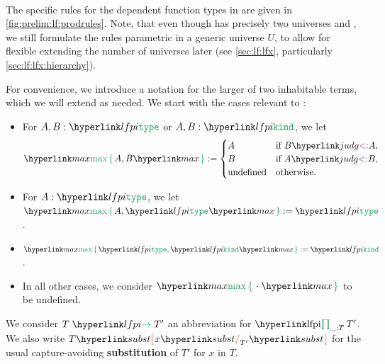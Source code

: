 % 


\paragraph{} The specific rules for the dependent function types in \LF are given in \autoref{fig:prelim:lf:prodrules}. Note, that even though \LF has precisely two universes \type and \kind, we still formulate the rules parametric in a generic universe $U$, to allow for flexible extending the number of universes later (see \autoref{sec:lf:lfx}, particularly \autoref{sec:lf:lfx:hierarchy}). \medskip

\begin{definition}\label{def:lf:max}
\hypertarget{max}{For convenience, we introduce a notation for the larger of two inhabitable terms}, which we will extend as needed. We start with the cases relevant to \LF:
\begin{itemize}
	\item For $A,B:\type$ or $A,B:\kind$, we let 
		\[\umax{A,B}:=\begin{cases}A & \text{if }\subtp BA, \\ B & \text{if }\subtp AB, \\ \text{undefined} & \text{otherwise.}\end{cases}\]
	\item For $A:\type$, we let $\umax{A,\type}:=\type$.
	\item $\umax{\type,\kind}:=\kind$.
	\item In all other cases, we consider $\umax\cdot$ to be undefined.
\end{itemize}
\end{definition}

We consider $\lfarrow T{T'}$ an abbreviation for $\lfpi{\_:T}{T'}$.
\hypertarget{subst}{We also write $T\sub x{T'}$ for the usual capture-avoiding \textbf{substitution} of $T'$ for $x$ in $T$.}


